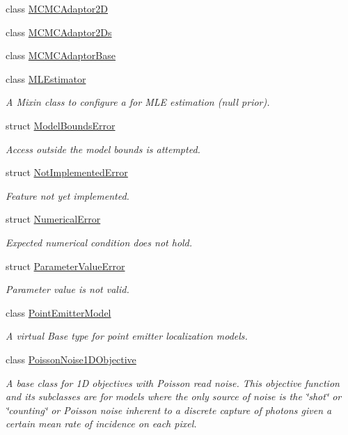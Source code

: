 \begin{DoxyCompactItemize}
class \hyperlink{classmappel_1_1MCMCAdaptor2D}{M\+C\+M\+C\+Adaptor2D}
\item 
class \hyperlink{classmappel_1_1MCMCAdaptor2Ds}{M\+C\+M\+C\+Adaptor2\+Ds}
\item 
class \hyperlink{classmappel_1_1MCMCAdaptorBase}{M\+C\+M\+C\+Adaptor\+Base}
\item 
class \hyperlink{classmappel_1_1MLEstimator}{M\+L\+Estimator}
\begin{DoxyCompactList}\small\item\em A Mixin class to configure a for M\+LE estimation (null prior). \end{DoxyCompactList}\item 
struct \hyperlink{structmappel_1_1ModelBoundsError}{Model\+Bounds\+Error}
\begin{DoxyCompactList}\small\item\em Access outside the model bounds is attempted. \end{DoxyCompactList}\item 
struct \hyperlink{structmappel_1_1NotImplementedError}{Not\+Implemented\+Error}
\begin{DoxyCompactList}\small\item\em Feature not yet implemented. \end{DoxyCompactList}\item 
struct \hyperlink{structmappel_1_1NumericalError}{Numerical\+Error}
\begin{DoxyCompactList}\small\item\em Expected numerical condition does not hold. \end{DoxyCompactList}\item 
struct \hyperlink{structmappel_1_1ParameterValueError}{Parameter\+Value\+Error}
\begin{DoxyCompactList}\small\item\em Parameter value is not valid. \end{DoxyCompactList}\item 
class \hyperlink{classmappel_1_1PointEmitterModel}{Point\+Emitter\+Model}
\begin{DoxyCompactList}\small\item\em A virtual Base type for point emitter localization models. \end{DoxyCompactList}\item 
class \hyperlink{classmappel_1_1PoissonNoise1DObjective}{Poisson\+Noise1\+D\+Objective}
\begin{DoxyCompactList}\small\item\em A base class for 1D objectives with Poisson read noise. This objective function and its subclasses are for models where the only source of noise is the \char`\"{}shot\char`\"{} or \char`\"{}counting\char`\"{} or Poisson noise inherent to a discrete capture of photons given a certain mean rate of incidence on each pixel. \end{DoxyCompactList}\item 

\end{DoxyCompactItemize}
